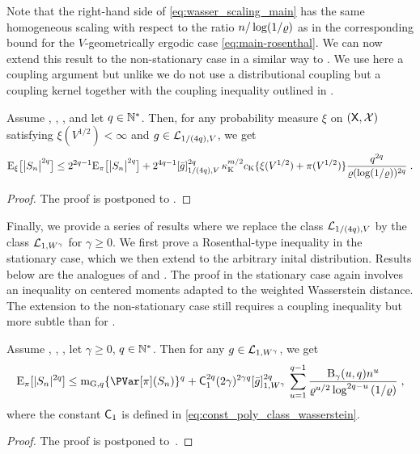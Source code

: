 \documentclass[sn-mathphys,Numbered]{sn-jnl}%
\begin{document}
Note that the right-hand side of \eqref{eq:wasser_scaling_main} has the same homogeneous scaling with respect to the ratio $n/\log(1/\ratewas)$ as in the corresponding bound for the $V$-geometrically ergodic case \eqref{eq:main-rosenthal}. We can now extend this result to the non-stationary case in a similar way to .
We use here a coupling argument but unlike  we do not use a distributional coupling but a coupling kernel together with the coupling inequality outlined in .
\begin{theorem}
\label{theo:changeofmeasure_wasser}
Assume , , , and let $q \in \nset^*$. Then, for any probability measure $\xi$ on $(\Xset,\Xsigma)$ satisfying $\xi(V^{1/2}) < \infty$ and $g \in \Lclass_{1/(4q), V}$, we get
\begin{equation*}
     \PE_\xi\big[ \big|S_n \big|^{2q} \big] \leq 2^{2q-1} \PE_\pi\big[ \big|S_n \big|^{2q} \big] + 2^{4q-1} \Nnorm[1/(4q), V]{\bar{g}}^{2q}\,\boundmetric^{m/2}  \vartconstwas \{\xi(V^{1/2}) + \pi(V^{1/2})\} \frac{q^{2q}}{\ratewas (\log(1/\ratewas))^{2q}}\eqsp.
\end{equation*}
\end{theorem}
\begin{proof}
  The proof is postponed to .
\end{proof}

Finally, we provide a series of results where we replace the class $\Lclass_{1/(4q), V}$ by the class $\Lclass_{1, W^\gamma}$ for $\gamma \geq 0$. We first prove a Rosenthal-type inequality in the stationary case, which we then extend to the arbitrary inital distribution. Results below are the analogues of  and . The proof in the stationary case again involves an inequality on centered moments adapted to the weighted Wasserstein distance. The extension to the non-stationary case still requires a coupling inequality but more subtle than for .
\begin{theorem}\label{th:rosenthal_log_V_wasserstein}
  Assume , , , let $\gamma \geq 0$, $q \in \nset^*$.  Then for any $g \in \Lclass_{1, W^\gamma}$, we get
\begin{equation*}
\PE_{\pi}[|S_n|^{2q}] \leq \momentGq[q] \{\PVar[\pi](S_n)\}^q+  \Constwasspoly^{2q} (2\gamma)^{2\gamma q} \Nnorm[1,W^\gamma]{\bar{g}}^{2q}\,\sum_{u=1}^{q-1} \frac{\ConstB_{\gamma}(u,q) n^{u}}{\ratewas^{u/2} \log^{2q-u}{(1/\ratewas)}}\eqsp,
\end{equation*}
where the constant $\Constwasspoly$ is defined in \eqref{eq:const_poly_class_wasserstein}.
\end{theorem}
\begin{proof}
The proof is postponed to~.
\end{proof}
\end{document}
